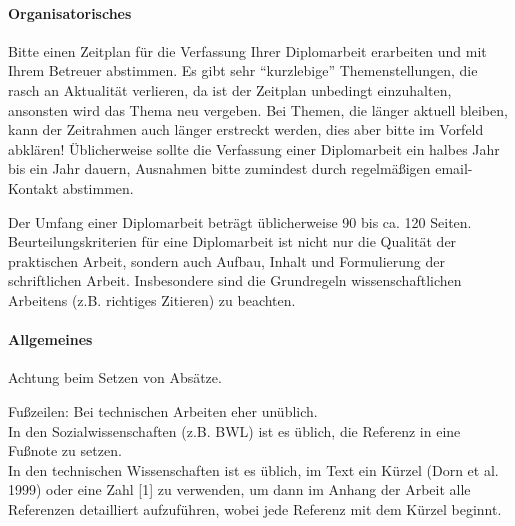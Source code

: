 \paragraph{Organisatorisches}
Bitte einen Zeitplan für die Verfassung Ihrer Diplomarbeit erarbeiten und mit Ihrem Betreuer abstimmen. Es gibt sehr \enquote{kurzlebige} Themenstellungen, die rasch an Aktualität verlieren, da ist der Zeitplan unbedingt einzuhalten, ansonsten wird das Thema neu vergeben. Bei Themen, die länger aktuell bleiben, kann der Zeitrahmen auch länger erstreckt werden, dies aber bitte im Vorfeld abklären! Üblicherweise sollte die Verfassung einer Diplomarbeit ein halbes Jahr bis ein Jahr dauern, Ausnahmen bitte zumindest durch regelmäßigen email-Kontakt abstimmen.

Der Umfang einer Diplomarbeit beträgt üblicherweise 90 bis ca. 120 Seiten. Beurteilungskriterien für eine Diplomarbeit ist nicht nur die Qualität der praktischen Arbeit, sondern auch Aufbau, Inhalt und Formulierung der schriftlichen Arbeit. Insbesondere sind die Grundregeln wissenschaftlichen Arbeitens (z.B. richtiges Zitieren) zu beachten.

\paragraph{Allgemeines}
Achtung beim Setzen von Absätze.

Fußzeilen: Bei technischen Arbeiten eher unüblich. \\
In den Sozialwissenschaften (z.B. BWL) ist es üblich, die Referenz in eine Fußnote zu setzen. 
\\
In den technischen Wissenschaften ist es üblich, im Text ein Kürzel (Dorn et al. 1999) oder eine Zahl [1] zu verwenden, um dann im Anhang der Arbeit alle Referenzen detailliert aufzuführen, wobei jede Referenz mit dem Kürzel beginnt.

